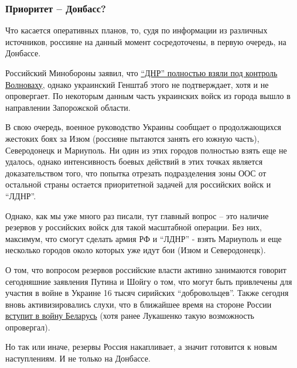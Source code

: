  
 
 
 
 

\subsubsection{Приоритет – Донбасс?}
\label{sec:11_03_2022.stz.news.ua.strana.1.kiev_v_osade_itogi.2.prioritet_donbass}

Что касается оперативных планов, то, судя по информации из различных
источников, россияне на данный момент сосредоточены, в первую очередь, на
Донбассе.

Российский Минобороны заявил, что \href{https://strana.news/news/381243-volnovakha-minoborony-rossii-zajavilo-chto-vojska-dnr-polnostju-kontrolirujut-horod.html}{\enquote{ДНР} полностью взяли под контроль Волноваху},
однако украинский Генштаб этого не подтверждает, хотя и не опровергает. По
некоторым данным часть украинских войск из города вышло в направлении
Запорожской области.

В свою очередь, военное руководство Украины сообщает о продолжающихся жестоких
боях за Изюм (россияне пытаются занять его южную часть), Северодонецк и
Мариуполь. Ни один из этих городов полностью взять еще не удалось, однако
интенсивность боевых действий в этих точках является доказательством того, что
попытка отрезать подразделения зоны ООС от остальной страны остается
приоритетной задачей для российских войск и \enquote{ЛДНР}.

Однако, как мы уже много раз писали, тут главный вопрос – это наличие резервов
у российских войск для такой масштабной операции. Без них, максимум, что смогут
сделать армия РФ и \enquote{ЛДНР} - взять Мариуполь и еще несколько городов около
которых уже идут бои (Изюм и Северодонецк).  

О том, что вопросом резервов российские власти активно занимаются говорит
сегодняшние заявления Путина и Шойгу о том, что могут быть привлечены для
участия в войне в Украине 16 тысяч сирийских \enquote{добровольцев}. Также
сегодня вновь активизировались слухи, что в ближайшее время на стороне России
\href{https://strana.news/news/381326-belorusskaja-armija-mozhet-vstupit-v-vojnu-v-ukraine-11-marta-v-2100.html}{вступит
в войну Беларусь} (хотя ранее Лукашенко такую возможность опровергал).

Но так или иначе, резервы Россия накапливает, а значит готовится к новым
наступлениям. И не только на Донбассе.
